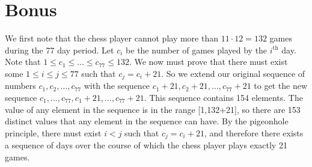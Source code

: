 \documentclass{article}
\begin{document}
\section{Bonus} %
We first note that the chess player cannot play more than $11\cdot12=132$ games
during the 77 day period. Let $c_i$ be the number of games played by the $i^\text{th}$
day. Note that $1 \le c_1 \le \ldots \le c_{77} \le 132$. We now must prove that there
must exist some $1 \le i \le j \le 77$ such that $c_j=c_i+21$. So we extend our
original sequence of numbers $c_1,c_2,\ldots,c_{77}$ with the sequence
$c_1+21,c_2+21,\ldots,c_{77}+21$ to get the new sequence
$c_1,\ldots,c_{77},c_1+21,\ldots,c_{77}+21$. This sequence contains 154 elements.
The value of any element in the sequence is in the range [1,132+21], so there are
153 distinct values that any element in the sequence can have. By the pigeonhole
principle, there must exist $i<j$ such that $c_j=c_i+21$, and therefore there
exists a sequence of days over the course of which the chess player plays exactly
21 games.
\end{document}
